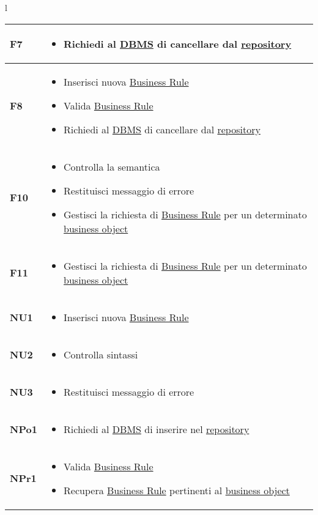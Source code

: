 {\begin{tabular}{l}
\begin{tabular}{||p{2cm}||p{10cm}||} \hline
\textbf{F7} & \begin{itemize}
\item Richiedi al \underline{DBMS} di cancellare dal \underline{repository}
\end{itemize}\\ \hline


\textbf{F8} & \begin{itemize}
\item Inserisci nuova \underline{Business Rule}
\item Valida \underline{Business Rule}
\item Richiedi al \underline{DBMS} di cancellare dal \underline{repository}
\end{itemize} \\ \hline
\textbf{F10} & \begin{itemize}
\item Controlla la semantica
\item Restituisci messaggio di errore
\item Gestisci la richiesta di \underline{Business Rule} per un determinato \underline{business object}
\end{itemize} \\ \hline
\textbf{F11} & \begin{itemize}
\item Gestisci la richiesta di \underline{Business Rule} per un determinato \underline{business object}
\end{itemize} \\ \hline
\textbf{NU1} & \begin{itemize}
\item Inserisci nuova \underline{Business Rule}
\end{itemize} \\ \hline
\textbf{NU2} & \begin{itemize}
\item Controlla sintassi
\end{itemize} \\ \hline
\textbf{NU3} & \begin{itemize}
\item Restituisci messaggio di errore
\end{itemize} \\ \hline
\textbf{NPo1} & \begin{itemize}
\item Richiedi al \underline{DBMS} di inserire nel \underline{repository}
\end{itemize} \\ \hline
\textbf{NPr1} & \begin{itemize}
\item Valida \underline{Business Rule}
\item Recupera \underline{Business Rule} pertinenti al \underline{business object}
\end{itemize} \\ \hline


\end{tabular}
\end{tabular}}
